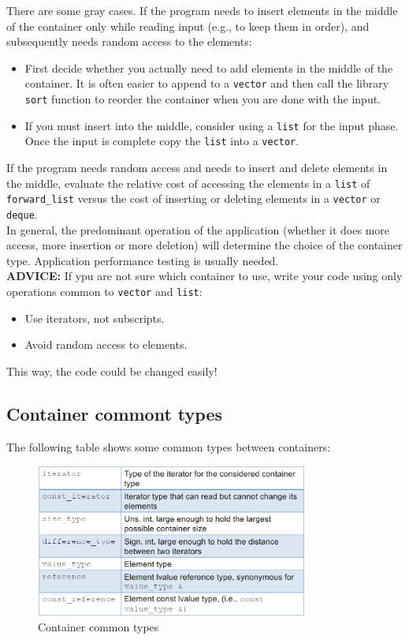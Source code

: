 There are some gray cases. If the program needs to insert elements in the middle of the container
only while reading input (e.g., to keep them in order), and subsequently needs random access to
the elements:
\begin{itemize}
    \item First decide whether you actually need to add elements in the middle of the container. It
    is often easier to append to a \texttt{vector} and then call the library \texttt{sort} function
    to reorder the container when you are done with the input.

    \item If you must insert into the middle, consider using a \texttt{list} for the input phase.
    Once the input is complete copy the \texttt{list} into a \texttt{vector}.
\end{itemize}

If the program needs random access and needs to insert and delete elements in the middle, evaluate 
the relative cost of accessing the elements in a \texttt{list} of \texttt{forward\_list} versus
the cost of inserting or deleting elements in a \texttt{vector} or \texttt{deque}.\\

In general, the predominant operation of the application (whether it does more access, more
insertion or more deletion) will determine the choice of the container type. Application 
performance testing is usually needed.\\

\textbf{ADVICE:} If ypu are not sure which container to use, write your code using only operations
common to \texttt{vector} and \texttt{list}:
\begin{itemize}
    \item Use iterators, not subscripts.
    \item Avoid random access to elements.
\end{itemize}

This way, the code could be changed easily!

\subsection{Container commont types}

The following table shows some common types between containers:

\begin{figure}[H]
    \centering
    \includegraphics[width=0.8\textwidth]{figures/container_common_types.png}
    \caption{Container common types}
    \label{fig:common_types_container}
\end{figure}

